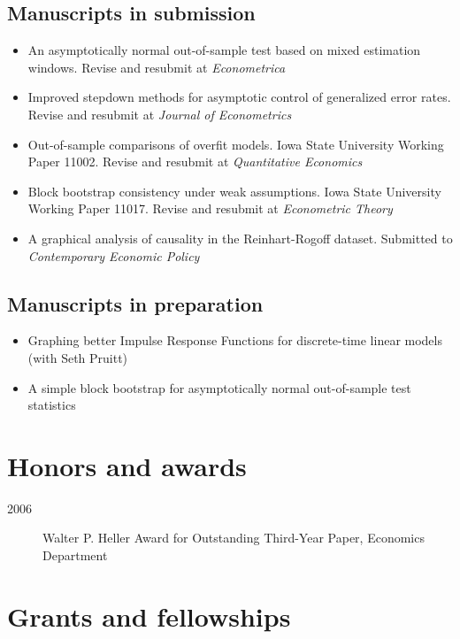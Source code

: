\documentclass[11pt]{article}%
\newcommand{\allcaps}[1]{\textls{\MakeUppercase{#1}}}
\begin{document}
\subsection*{Manuscripts in submission}

\begin{itemize}
\item An asymptotically normal out-of-sample test based on mixed
  estimation windows. Revise and resubmit at \textit{Econometrica}
\item Improved stepdown methods for asymptotic control of generalized
  error rates. Revise and resubmit at \textit{Journal of Econometrics}
\item Out-of-sample comparisons of overfit models. Iowa State
  University Working Paper 11002. Revise and resubmit at
  \textit{Quantitative Economics}
\item Block bootstrap consistency under weak assumptions. Iowa State
  University Working Paper 11017. Revise and resubmit at
  \textit{Econometric Theory}
\item A graphical analysis of causality in the Reinhart-Rogoff
  dataset. Submitted to \textit{Contemporary Economic Policy}
\end{itemize}
  
\subsection*{Manuscripts in preparation}
\begin{itemize}
\item Graphing better Impulse Response Functions for discrete-time
  linear models (with Seth Pruitt)
\item A simple block bootstrap for asymptotically normal out-of-sample
  test statistics
\end{itemize}

\section*{Honors and awards}

\begin{description}
\item[2006] Walter P. Heller Award for Outstanding Third-Year Paper,
\allcaps{UCSD} Economics Department
\end{description}

\section*{Grants and fellowships}
\end{document}
